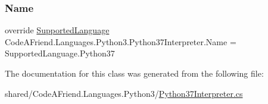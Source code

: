 \subsubsection{\texorpdfstring{Name}{Name}}
{\footnotesize\ttfamily override \mbox{\hyperlink{namespace_code_a_friend_1_1_data_model_a13e088c525db1b03a4de75420ced79b2}{Supported\+Language}} Code\+A\+Friend.\+Languages.\+Python3.\+Python37\+Interpreter.\+Name = Supported\+Language.\+Python37\hspace{0.3cm}{\ttfamily [get]}}







The documentation for this class was generated from the following file\+:\begin{DoxyCompactItemize}
\item 
shared/\+Code\+A\+Friend.\+Languages.\+Python3/\mbox{\hyperlink{_python37_interpreter_8cs}{Python37\+Interpreter.\+cs}}\end{DoxyCompactItemize}
